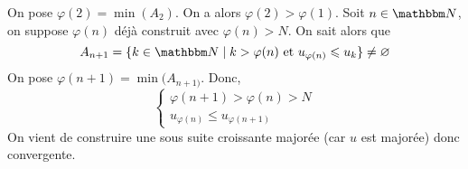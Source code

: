\begin{prv}
\begin{itemize}
\begin{itemize}
				On pose $\varphi(2) = \min(A_2)$. On a alors $\varphi(2) > \varphi(1)$. Soit $n\in \N$, on suppose $\varphi(n)$ déjà construit avec  $\varphi(n) > N$. On sait alors que \[
				A_{n+1} = \{k\in \N \mid k > \varphi(n) \text{ et } u_{\varphi(n)} \le u_k\} \neq \O
				\] On pose $\varphi(n+1) = \min(A_{n+1)}$. Donc, \[
				\begin{cases}
					\varphi(n+1) > \varphi(n) > N\\
					u_{\varphi(n)} \le u_{\varphi(n+1)}
				\end{cases}
				\]
				On vient de construire une sous suite croissante majorée (car $u$ est majorée) donc convergente.
			\end{itemize}
	\end{itemize}
\end{prv}
